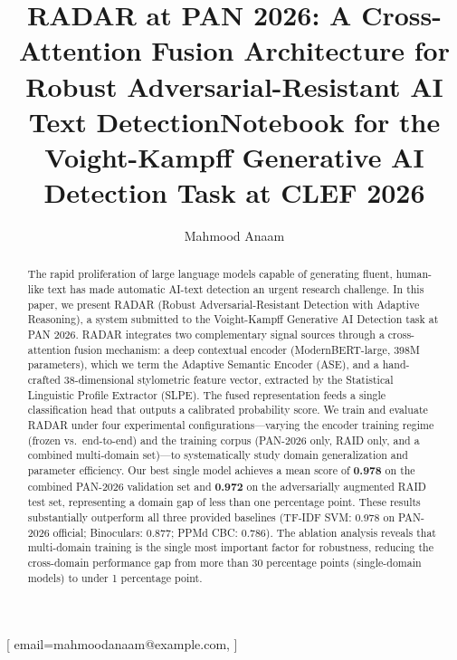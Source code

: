 \documentclass[]{ceurart}
\begin{document}


\title{RADAR at PAN 2026: A Cross-Attention Fusion Architecture for Robust Adversarial-Resistant AI Text Detection}
\title[mode=sub]{Notebook for the Voight-Kampff Generative AI Detection Task at CLEF 2026}

\author[1]{Mahmood Anaam}[%
  email=mahmoodanaam@example.com,
]
\address[1]{Independent Researcher}


\begin{abstract}
The rapid proliferation of large language models capable of generating fluent, human-like text has made automatic AI-text detection an urgent research challenge. In this paper, we present RADAR (Robust Adversarial-Resistant Detection with Adaptive Reasoning), a system submitted to the Voight-Kampff Generative AI Detection task at PAN 2026. RADAR integrates two complementary signal sources through a cross-attention fusion mechanism: a deep contextual encoder (ModernBERT-large, 398M parameters), which we term the Adaptive Semantic Encoder (ASE), and a hand-crafted 38-dimensional stylometric feature vector, extracted by the Statistical Linguistic Profile Extractor (SLPE). The fused representation feeds a single classification head that outputs a calibrated probability score. We train and evaluate RADAR under four experimental configurations—varying the encoder training regime (frozen vs.\ end-to-end) and the training corpus (PAN-2026 only, RAID only, and a combined multi-domain set)—to systematically study domain generalization and parameter efficiency. Our best single model achieves a mean score of \textbf{0.978} on the combined PAN-2026 validation set and \textbf{0.972} on the adversarially augmented RAID test set, representing a domain gap of less than one percentage point. These results substantially outperform all three provided baselines (TF-IDF SVM: 0.978 on PAN-2026 official; Binoculars: 0.877; PPMd CBC: 0.786). The ablation analysis reveals that multi-domain training is the single most important factor for robustness, reducing the cross-domain performance gap from more than 30 percentage points (single-domain models) to under 1 percentage point.
\end{abstract}
\end{document}
